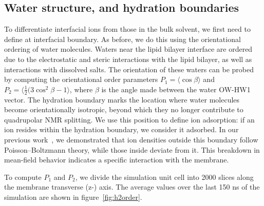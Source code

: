 \subsection{Water structure, and hydration boundaries}
To differentiate interfacial ions from those in the bulk solvent, we first need to define at interfacial boundary. As before\cite{saunders:2024}, we do this using the orientational ordering of water molecules. Waters near the lipid bilayer interface are ordered due to the electrostatic and steric interactions with the lipid bilayer, as well as interactions with dissolved salts. The
orientation of these waters can be probed by computing the orientational order parameters $P_1=\langle\cos{\beta}\rangle$ and $P_2=\langle{\frac{1}{2}(3\cos^{2}{\beta}-1}\rangle$, where $\beta$ is the angle made between the water OW-HW1 vector. The hydration boundary marks the location where water molecules become orientationally isotropic, beyond which they no longer contribute to quadrupolar NMR splitting. We use this position to define ion adsorption: if an ion resides within the hydration boundary, we consider it adsorbed. In our previous work~\cite{saunders:2024}, we demonstrated that ion densities outside this boundary follow Poisson–Boltzmann theory, while those inside deviate from it. This breakdown in mean-field behavior indicates a specific interaction with the membrane.

To compute $P_1$ and $P_2$, we divide the simulation unit cell into 2000 slices along the membrane transverse (z-) axis.
The average values over the last 150 ns of the simulation are shown in figure~\ref{fig:h2order}.

